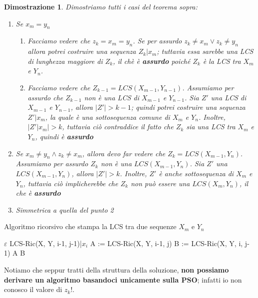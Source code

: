 \documentclass[12pt]{article}
\newtheorem{Dimostrazione}{Dimostrazione}[subsection]
\begin{document}
\begin{Dimostrazione}
    Dimostriamo tutti i casi del teorema sopra:
    \begin{enumerate}
        \item Se $x_m = y_n$
        \begin{enumerate}
            \item Facciamo vedere che $z_k = x_m = y_n$. Se per assurdo $z_k \neq x_m \vee z_k \neq y_n$ allora potrei
            costruire una sequenza $Z_k|x_m$; tuttavia essa sarebbe una LCS di lunghezza maggiore di $Z_k$, il chè è \textbf{assurdo} poiché
            $Z_k$ è la LCS tra $X_m$ e $Y_n$.
            \item Facciamo vedere che $Z_{k-1} = LCS(X_{m-1}, Y_{n-1})$. Assumiamo per assurdo che $Z_{k-1}$ non è una LCS di $X_{m-1}$ e $Y_{n-1}$.
            Sia $Z'$ una LCS di $X_{m-1}$ e $Y_{n-1}$, allora $|Z'| > k-1$; quindi potrei costruire una sequenza $Z'|x_m$, la quale è una sottosequenza comune
            di $X_m$ e $Y_n$. Inoltre, $|Z'|x_m| > k$, tuttavia ciò contraddice il fatto che $Z_k$ sia una LCS tra $X_m$ e $Y_n$, quindi è \textbf{assurdo}
        \end{enumerate}
        \item Se $x_m \neq y_n \land z_k \neq x_m$, allora devo far vedere che $Z_k = LCS(X_{m-1}, Y_n)$. Assumiamo per assurdo $Z_k$ non è una $LCS(X_{m-1}, Y_n)$.
        Sia $Z'$ una $LCS(X_{m-1}, Y_n)$, allora $|Z'| > k$. Inoltre, $Z'$ è anche sottosequenza di $X_m$ e $Y_n$, tuttavia ciò implicherebbe che $Z_k$ non può essere una $LCS(X_m, Y_n)$, il che è \textbf{assurdo}
        \item Simmetrica a quella del punto 2
    \end{enumerate}
\end{Dimostrazione}
\begin{algorithm}[H]
    \caption{Algoritmo ricorsivo che stampa la LCS tra due sequenze $X_m$ e $Y_n$}
    \DontPrintSemicolon
     {
         {
            \Return $\varepsilon$
        } {
             {
                \Return LCS-Ric(X, Y, i-1, j-1)|$x_i$
            }  {
                A := LCS-Ric(X, Y, i-1, j) \;
                B := LCS-Ric(X, Y, i, j-1) \;
                 {
                    \Return A
                } {
                    \Return B
                }
            }
        }
    }
\end{algorithm}
Notiamo che seppur tratti della struttura della soluzione, \textbf{non possiamo derivare un algoritmo basandoci unicamente sulla PSO}; infatti io non conosco il valore di $z_k$!.
\end{document}
